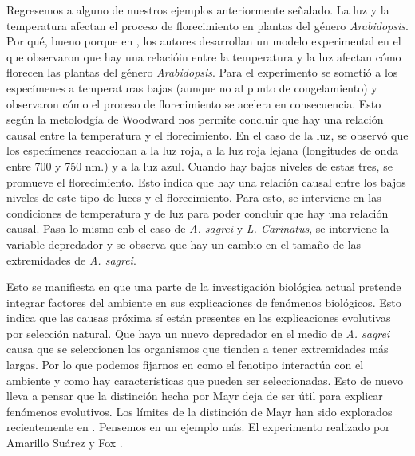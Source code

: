Regresemos a alguno de nuestros ejemplos anteriormente señalado. La luz y la temperatura afectan el proceso de florecimiento en plantas del género \emph{Arabidopsis}. Por qué, bueno porque en \cite{AusinEnviro}, los autores desarrollan un modelo experimental en el que observaron que hay una relacióin entre la temperatura y la luz afectan cómo florecen las plantas del género \emph{Arabidopsis}. Para el experimento se sometió a los especímenes a temperaturas bajas (aunque no al punto de congelamiento) y observaron cómo el proceso de florecimiento se acelera en consecuencia. Esto según la metolodgía de Woodward nos permite concluir que hay una relación causal entre la temperatura y el florecimiento. En el caso de la luz, se observó que los especímenes reaccionan a la luz roja, a la luz roja lejana (longitudes de onda entre 700 y 750 nm.) y a la luz azul. Cuando hay bajos niveles de estas tres, se promueve el florecimiento. Esto indica que hay una relación causal entre los bajos niveles de este tipo de luces y el florecimiento. Para esto, se interviene en las condiciones de temperatura y de luz para poder concluir que hay una relación causal. Pasa lo mismo enb el caso de \emph{A. sagrei} y \emph{L. Carinatus}, se interviene la variable depredador y se observa que hay un cambio en el tamaño de las extremidades de \emph{A. sagrei}.

Esto se manifiesta en que una parte de la investigación biológica actual pretende integrar factores del ambiente en sus explicaciones de fenómenos biológicos. Esto indica que las causas próxima sí están presentes en las explicaciones evolutivas por selección natural. Que haya un nuevo depredador en el medio de \emph{A. sagrei} causa que se seleccionen los organismos que tienden a tener extremidades más largas. Por lo que podemos fijarnos en como el fenotipo interactúa con el ambiente y como hay características que pueden ser seleccionadas. Esto de nuevo lleva a pensar que la distinción hecha por Mayr deja de ser útil para explicar fenómenos evolutivos. Los límites de la distinción de Mayr han sido explorados recientemente en \cite{Uller2020, Dayan2020, Laland2011}. Pensemos en un ejemplo más. El experimento realizado por Amarillo Suárez y Fox \citeyear{Amarillo-Suarez2006}.

